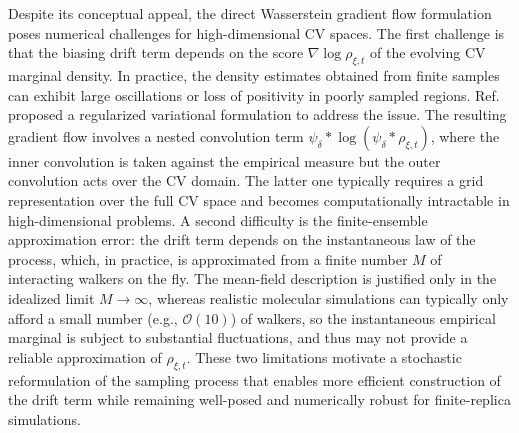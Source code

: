 \documentclass[a4paper,fleqn]{cas-sc}
\theoremstyle{definition}
\begin{document}
Despite its conceptual appeal, the direct Wasserstein gradient flow formulation poses numerical challenges for high-dimensional CV spaces. 
The first challenge is that the biasing drift term depends on the score \(\nabla\log\rho_{\xi,t}\) of the evolving CV marginal density. 
In practice, the density estimates obtained from finite samples can exhibit large oscillations or loss of positivity in poorly sampled regions. Ref. ~\cite{lelievre2025convergence} proposed a regularized variational formulation to address the issue. The resulting gradient flow involves a nested convolution term
$\psi_\delta \ast \log(\psi_\delta \ast \rho_{\xi,t})$, 
where the inner convolution is taken against the empirical measure but the outer convolution acts over the CV domain. The latter one typically requires a grid representation over the full CV space and becomes computationally intractable in high-dimensional problems. 
A second difficulty is the finite-ensemble approximation error: the drift term depends on the instantaneous law of the process, which, in practice, is approximated from a finite number $M$ of interacting walkers on the fly. The mean-field description is justified only in the idealized limit $M\to \infty$, whereas realistic molecular simulations can typically only afford a small number (e.g., $\mathcal{O}(10)$) of walkers, so the instantaneous empirical marginal is subject to substantial fluctuations, and thus may not provide a reliable approximation of \(\rho_{\xi,t}\). 
These two limitations motivate a stochastic reformulation of the sampling process that enables more efficient construction of the drift term while remaining well-posed and numerically robust for finite-replica simulations. 
\end{document}
